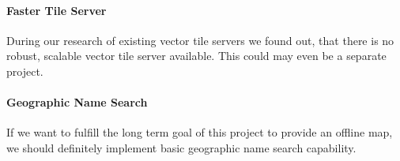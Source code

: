 \paragraph{Faster Tile Server}
During our research of existing vector tile servers we found out, that there is no robust, scalable vector tile server available. This could may even be a separate project.

\paragraph{Geographic Name Search}
If we want to fulfill the long term goal of this project to provide an offline map, we should definitely implement basic geographic name search capability.

\newpage{}